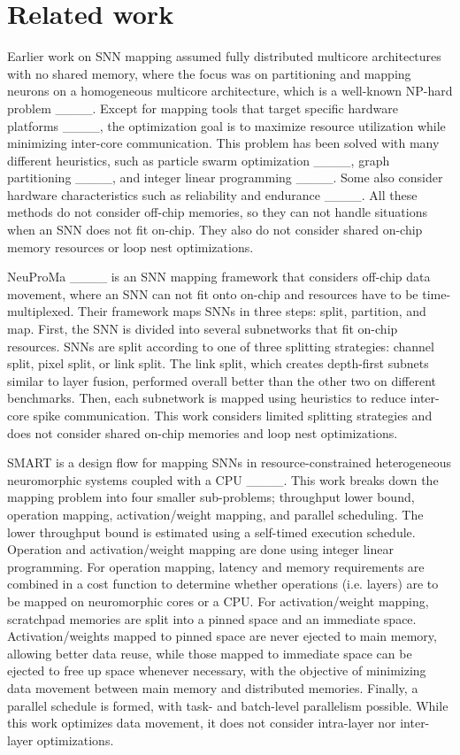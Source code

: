 \section{Related work}
\label{sec:related_work}

Earlier work on SNN mapping assumed fully distributed multicore architectures with no shared memory, where the focus was on partitioning and mapping neurons on a homogeneous multicore architecture, which is a well-known NP-hard problem ____. Except for mapping tools that target specific hardware platforms ____, the optimization goal is to maximize resource utilization while minimizing inter-core communication. This problem has been solved with many different heuristics, such as particle swarm optimization ____, graph partitioning ____, and integer linear programming ____. Some also consider hardware characteristics such as reliability and endurance ____. All these methods do not consider off-chip memories, so they can not handle situations when an SNN does not fit on-chip. They also do not consider shared on-chip memory resources or loop nest optimizations.

NeuProMa ____ is an SNN mapping framework that considers off-chip data movement, where an SNN can not fit onto on-chip and resources have to be time-multiplexed. Their framework maps SNNs in three steps: split, partition, and map. First, the SNN is divided into several subnetworks that fit on-chip resources. SNNs are split according to one of three splitting strategies: channel split, pixel split, or link split. The link split, which creates depth-first subnets similar to layer fusion, performed overall better than the other two on different benchmarks. Then, each subnetwork is mapped using heuristics to reduce inter-core spike communication. This work considers limited splitting strategies and does not consider shared on-chip memories and loop nest optimizations.

SMART is a design flow for mapping SNNs in resource-constrained heterogeneous neuromorphic systems coupled with a CPU ____. This work breaks down the mapping problem into four smaller sub-problems; throughput lower bound, operation mapping, activation/weight mapping, and parallel scheduling. The lower throughput bound is estimated using a self-timed execution schedule. Operation and activation/weight mapping are done using integer linear programming. For operation mapping, latency and memory requirements are combined in a cost function to determine whether operations (i.e. layers) are to be mapped on neuromorphic cores or a CPU. For activation/weight mapping, scratchpad memories are split into a pinned space and an immediate space. Activation/weights mapped to pinned space are never ejected to main memory, allowing better data reuse, while those mapped to immediate space can be ejected to free up space whenever necessary, with the objective of minimizing data movement between main memory and distributed memories. Finally, a parallel schedule is formed, with task- and batch-level parallelism possible. While this work optimizes data movement, it does not consider intra-layer nor inter-layer optimizations.


